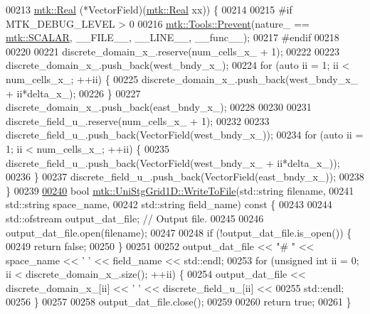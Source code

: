 \begin{DoxyCode}
00213     \hyperlink{group__c01-roots_gac080bbbf5cbb5502c9f00405f894857d}{mtk::Real} (*VectorField)(\hyperlink{group__c01-roots_gac080bbbf5cbb5502c9f00405f894857d}{mtk::Real} xx)) \{
00214 
00215 \textcolor{preprocessor}{  #if MTK\_DEBUG\_LEVEL > 0}
00216   \hyperlink{classmtk_1_1Tools_a332324c6f25e66be9dff48c5987a3b9f}{mtk::Tools::Prevent}(nature\_ == \hyperlink{namespacemtk_ga4c54f2a329cfb4e56213b02a259d19e2af481d45bd70d41381c7d72e200889205}{mtk::SCALAR}, \_\_FILE\_\_, \_\_LINE\_\_, \_\_func\_\_);
00217 \textcolor{preprocessor}{  #endif}
00218 
00220 
00221   discrete\_domain\_x\_.reserve(num\_cells\_x\_ + 1);
00222 
00223   discrete\_domain\_x\_.push\_back(west\_bndy\_x\_);
00224   \textcolor{keywordflow}{for} (\textcolor{keyword}{auto} ii = 1; ii < num\_cells\_x\_; ++ii) \{
00225     discrete\_domain\_x\_.push\_back(west\_bndy\_x\_ + ii*delta\_x\_);
00226   \}
00227   discrete\_domain\_x\_.push\_back(east\_bndy\_x\_);
00228 
00230 
00231   discrete\_field\_u\_.reserve(num\_cells\_x\_ + 1);
00232 
00233   discrete\_field\_u\_.push\_back(VectorField(west\_bndy\_x\_));
00234   \textcolor{keywordflow}{for} (\textcolor{keyword}{auto} ii = 1; ii < num\_cells\_x\_; ++ii) \{
00235     discrete\_field\_u\_.push\_back(VectorField(west\_bndy\_x\_ + ii*delta\_x\_));
00236   \}
00237   discrete\_field\_u\_.push\_back(VectorField(east\_bndy\_x\_));
00238 \}
00239 
\hypertarget{mtk__uni__stg__grid__1d_8cc_source_l00240}{}\hyperlink{classmtk_1_1UniStgGrid1D_a6d2c10aa9468a037829f0eb043b898dc}{00240} \textcolor{keywordtype}{bool} \hyperlink{classmtk_1_1UniStgGrid1D_a6d2c10aa9468a037829f0eb043b898dc}{mtk::UniStgGrid1D::WriteToFile}(std::string filename,
00241                                     std::string space\_name,
00242                                     std::string field\_name)\textcolor{keyword}{ const }\{
00243 
00244   std::ofstream output\_dat\_file;  \textcolor{comment}{// Output file.}
00245 
00246   output\_dat\_file.open(filename);
00247 
00248   \textcolor{keywordflow}{if} (!output\_dat\_file.is\_open()) \{
00249     \textcolor{keywordflow}{return} \textcolor{keyword}{false};
00250   \}
00251 
00252   output\_dat\_file << \textcolor{stringliteral}{"# "} << space\_name <<  \textcolor{charliteral}{' '} << field\_name << std::endl;
00253   \textcolor{keywordflow}{for} (\textcolor{keywordtype}{unsigned} \textcolor{keywordtype}{int} ii = 0; ii < discrete\_domain\_x\_.size(); ++ii) \{
00254     output\_dat\_file << discrete\_domain\_x\_[ii] << \textcolor{charliteral}{' '} << discrete\_field\_u\_[ii] <<
00255       std::endl;
00256   \}
00257 
00258   output\_dat\_file.close();
00259 
00260   \textcolor{keywordflow}{return} \textcolor{keyword}{true};
00261 \}
\end{DoxyCode}
